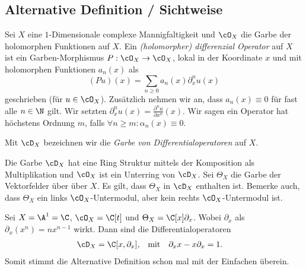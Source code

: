 \subsection{Alternative Definition / Sichtweise}
\begin{comment}
Nur abgeschrieben
\end{comment}
\cite[Chap 1.1.]{kashiwara2003d}
Sei $X$ eine $1$-Dimensionale complexe Mannigfaltigkeit und $\cO_X$ die Garbe
der holomorphen Funktionen auf $X$. Ein \emph{(holomorpher) differenzial
Operator} auf $X$ ist ein Garben-Morphismus $P:\cO_X\rightarrow \cO_X$, lokal
in der Koordinate $x$ und mit holomorphen Funktionen $a_n(x)$ als
\[
(Pu)(x)=\sum_{n\geq0}a_n(x)\partial_x^nu(x)
\]
geschrieben (für $u\in\cO_X$). Zusätzlich nehmen wir an, dass $a_n(x)\equiv 0$
für fast alle $n\in \N$ gilt. Wir setzten
$\partial_x^nu(x)=\frac{\partial^nu}{\partial x^n}(x)$. Wir sagen ein Operator
hat höchstens Ordnung $m$, falls $\forall n\geq m: \alpha_n(x)\equiv0$.
\begin{defn}
Mit $\cD_X$ bezeichnen wir die \emph{Garbe von Differentialoperatoren} auf $X$.
\end{defn}
Die Garbe $\cD_X$ hat eine Ring Struktur mittels der Komposition als
Multiplikation und $\cO_X$ ist ein Unterring von $\cD_X$. Sei $\Theta_X$ die
Garbe der Vektorfelder über über $X$. Es gilt, dass $\Theta_X$ in $\cD_X$
enthalten ist.  Bemerke auch, dass $\Theta_X$ ein links $\cO_X$-Untermodul,
aber kein rechts $\cO_X$-Untermodul ist.

\begin{prop}
\cite[Exmp 1.1]{ArkhipovDmod}
Sei $X=\A^1=\C$, $\cO_X=\C[t]$ und $\Theta_X=\C[x]\partial_x$. Wobei $\partial_x$
als $\partial_x(x^n)=nx^{n-1}$ wirkt. Dann sind die Differentialoperatoren
\begin{align*}
\cD_X &= \C[x,\partial_x], & \mbox{mit} & & \partial_x x-x\partial_x & =1.
\end{align*}
Somit stimmt die Alternative Definition schon mal mit der Einfachen überein.
\end{prop}

\begin{comment}
\begin{defn} \cite[Defn 2.1]{ArkhipovDmod}
Sei $X=\A^1$, $\cO_X=\C[x]$ und $\cD_X=[x,\partial_x]$ mit der Relation
$[\partial_x,x]=1$. Dann definieren wir die links $\cD$-Moduln über $\A^1$ als
die $\C[x,\partial_x]$-Moduln. Sie werden geschrieben als $\cD-mod(\A^1)$
\end{defn}
\end{comment}

